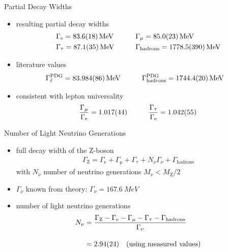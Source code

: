 \documentclass[11pt,xcolor=dvipsnames,professionalfonts]{beamer}
\begin{document}
\begin{frame}{Partial Decay Widths}
	\begin{itemize}
		\setlength\itemsep{2em}
		\item resulting partial decay widths
			\begin{alignat*}{2}
			&\Gamma_\mathrm{e} = \SI{83.6 +- 1.8}{MeV} \qquad
			&&\Gamma_\mathrm{\mu} = \SI{85.0 +- 2.3}{MeV}\\
			&\Gamma_\mathrm{\tau} = \SI{87.1 +- 3.5}{MeV}\qquad
			&&\Gamma_\mathrm{hadrons} = \SI{1778.5 +- 39}{MeV}
			\end{alignat*}
		
		\item<2-> literature values
		\begin{alignat*}{2}
		&\Gamma_\ell^\mathrm{PDG} = \SI{83.984 +- 0.086}{MeV} \qquad
		&&\Gamma_\mathrm{hadrons}^\mathrm{PDG} = \SI{1744.4 +- 2.0}{MeV}
		\end{alignat*}
		
		\item<3-> consistent with lepton universality
			\begin{align*}
				&\frac{\Gamma_\mathrm{\mu}}{\Gamma_\mathrm{e}} = \num{1.017 +- 0.044} \qquad 
				&\frac{\Gamma_\mathrm{\tau}}{\Gamma_\mathrm{e}} = \num{1.042 +- 0.055}
			\end{align*}
	\end{itemize}
\end{frame}

\begin{frame}{Number of Light Neutrino Generations}
	\begin{itemize}
		\setlength\itemsep{2em}
		\item<1-> full decay width of the Z-boson
		\begin{align*}
			\Gamma_\mathrm{Z} = \Gamma_\mathrm{e} + \Gamma_\mathrm{\mu} + \Gamma_\mathrm{\tau} + N_\nu \Gamma_\nu + \Gamma_\mathrm{hadrons}
		\end{align*}
		with $N_\nu$ number of neutrino generations $M_\nu < M_\mathrm{Z} / 2$
		
		\item<2-> $\Gamma_\nu$ known from theory: \quad $\Gamma_\nu = \SI{167.6}{MeV}$
		
		\item<3-> number of light neutrino generations
			\begin{align*}
			N_\nu &= \frac{\Gamma_\mathrm{Z} - \Gamma_\mathrm{e} - \Gamma_\mathrm{\mu} - \Gamma_\mathrm{\tau} - \Gamma_\mathrm{hadrons}}{\Gamma_\nu} \\[1.0em]
			&= \num{2.94 +- 0.24} \quad \text{(using measured values)}
			\end{align*}
	\end{itemize}
\end{frame}
\end{document}
